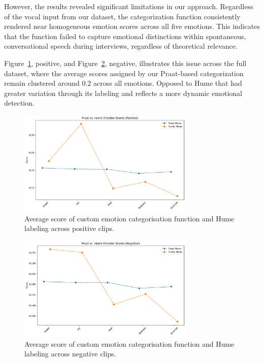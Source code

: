 However, the results revealed significant limitations in our approach. Regardless of the vocal input from our dataset, the categorization function consistently rendered near homogeneous emotion scores across all five emotions. This indicates that the function failed to capture emotional distinctions within spontaneous, conversational speech during interviews, regardless of theoretical relevance. 

Figure~\ref{fig:rq1_scatter_hume_praat_pos}, positive, and Figure~\ref{fig:rq1_scatter_hume_praat_neg}, negative, illustrates this issue across the full dataset, where the average scores assigned by our Praat-based categorization remain clustered around 0.2 across all emotions. Opposed to Hume that had greater variation through its labeling and reflects a more dynamic emotional detection.

\begin{figure}[H]
    \centering
    \includegraphics[width=0.75\textwidth]{png/results/rq1_new/praat_hume_positive_scatter.pdf}
    \caption{Average score of custom emotion categorisation function and Hume labeling across positive clips.}
    \label{fig:rq1_scatter_hume_praat_pos}
\end{figure}


\begin{figure}[H]
    \centering
    \includegraphics[width=0.75\textwidth]{png/results/rq1_new/praat_hume_negative_scatter.pdf}
    \caption{Average score of custom emotion categorisation function and Hume labeling across negative clips.}
    \label{fig:rq1_scatter_hume_praat_neg}
\end{figure}

